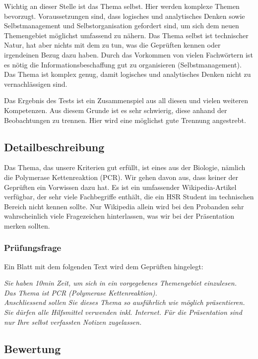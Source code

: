 Wichtig an dieser Stelle ist das Thema selbst. Hier werden komplexe Themen bevorzugt. Voraussetzungen sind, dass logisches und analytisches Denken sowie Selbstmanagement und Selbstorganisation gefordert sind, um sich dem neuen Themengebiet möglichst umfassend zu nähern. Das Thema selbst ist technischer Natur, hat aber nichts mit dem zu tun, was die Geprüften kennen oder irgendeinen Bezug dazu haben. Durch das Vorkommen von vielen Fachwörtern ist es nötig die Informationsbeschaffung gut zu organisieren (Selbstmanagement). Das Thema ist komplex genug, damit logisches und analytisches Denken nicht zu vernachlässigen sind.

Das Ergebnis des Tests ist ein Zusammenspiel aus all diesen und vielen weiteren Kompetenzen. Aus diesem Grunde ist es sehr schwierig, diese anhand der Beobachtungen zu trennen. Hier wird eine möglichst gute Trennung angestrebt.

\subsection{Detailbeschreibung}

Das Thema, das unsere Kriterien gut erfüllt, ist eines aus der Biologie, nämlich die Polymerase Kettenreaktion (PCR). Wir gehen davon aus, dass keiner der Geprüften ein Vorwissen dazu hat. Es ist ein umfassender Wikipedia-Artikel verfügbar, der sehr viele Fachbegriffe enthält, die ein HSR Student im technischen Bereich nicht kennen sollte. Nur Wikipedia allein wird bei den Probanden sehr wahrscheinlich viele Fragezeichen hinterlassen, was wir bei der Präsentation merken sollten. 

\subsubsection{Prüfungsfrage}
Ein Blatt mit dem folgenden Text wird dem Geprüften hingelegt:

\textit{Sie haben 10min Zeit, um sich in ein vorgegebenes Themengebiet einzulesen. \\\vspace*{2mm}
Das Thema ist PCR (Polymerase Kettenreaktion). \\
Anschliessend sollen Sie dieses Thema so ausführlich wie möglich präsentieren. Sie dürfen alle Hilfsmittel verwenden inkl. Internet. Für die Präsentation sind nur Ihre selbst verfassten Notizen zugelassen.}
\subsection{Bewertung}

